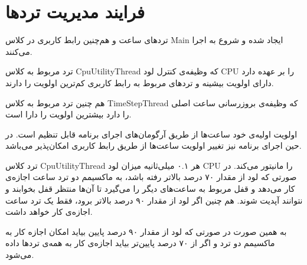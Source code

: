 \documentclass[oneside,a4paper,11pt]{report}
\begin{document}
	
	\section{فرایند مدیریت تردها}
	
	تردهای ساعت و هم‌چنین رابط کاربری در کلاس Main ایجاد شده و شروع به اجرا می‌کنند. 
	
	ترد مربوط به کلاس CpuUtilityThread
	که وظیفه‌ی کنترل لود CPU را بر عهده دارد دارای اولویت بیشینه و تردهای مربوط به رابط کاربری کم‌ترین اولویت را دارند.
	
	هم چنین ترد مربوط به کلاس TimeStepThread که وظیفه‌ی بروزرسانی ساعت اصلی را دارد بیشترین اولویت را دارا است.
	
	اولویت اولیه‌ی خود ساعت‌ها از طریق آرگومان‌های اجرای برنامه قابل تنظیم است. در حین اجرای برنامه نیز تغییر اولویت ساعت‌ها از طریق رابط کاربری امکان‌پذیر می‌باشد.
	
	ترد کلاس CpuUtilityThread هر ۰.۱ میلی‌ثانیه میزان لود CPU را مانیتور می‌کند. در صورتی که لود از مقدار ۷۰ درصد بالاتر رفته باشد، به ماکسیمم دو ترد ساعت اجازه‌ی کار می‌دهد و قفل مربوط به ساعت‌های دیگر را می‌گیرد تا آن‌ها منتظر قفل بخوابند و نتوانند آپدیت شوند. هم چنین اگر لود از مقدار ۹۰ درصد بالاتر برود، فقط یک ترد ساعت اجازه‌ی کار خواهد داشت.
	
	به همین صورت در صورتی که لود از مقدار ۹۰ درصد پایین بیاید امکان اجازه کار به ماکسیمم دو ترد و اگر از ۷۰ درصد پایین‌تر بیاید اجازه‌ی کار به همه‌ی تردها داده می‌شود.
	
\end{document}
